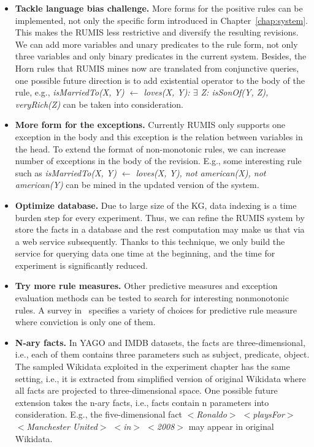\begin{itemize}
\item \textbf{Tackle language bias challenge.} More forms for the positive rules can be implemented, not only the specific form introduced in Chapter~\ref{chap:system}. This makes the RUMIS less restrictive and diversify the resulting revisions. We can add more variables and unary predicates to the rule form, not only three variables and only binary predicates in the current system. Besides, the Horn rules that RUMIS mines now are translated from conjunctive queries, one possible future direction is to add existential operator to the body of the rule, e.g., \textit{isMarriedTo(X, Y) $\leftarrow$ loves(X, Y): $\exists$ Z: isSonOf(Y, Z), veryRich(Z)} can be taken into consideration.
\item \textbf{More form for the exceptions.} Currently RUMIS only supports one exception in the body and this exception is the relation between variables in the head. To extend the format of non-monotonic rules, we can increase number of exceptions in the body of the revision. E.g., some interesting rule such as \textit{isMarriedTo(X, Y) $\leftarrow$ loves(X, Y), not american(X), not american(Y)} can be mined in the updated version of the system.
\item \textbf{Optimize database.} Due to large size of the KG, data indexing is a time burden step for every experiment. Thus, we can refine the RUMIS system by store the facts in a database and the rest computation may make us that via a web service subsequently. Thanks to this technique, we only build the service for querying data one time at the beginning, and the time for experiment is significantly reduced.
\item \textbf{Try more rule measures.} Other predictive measures and exception evaluation methods can be tested to search for interesting nonmonotonic rules. A survey in~\cite{ref46} specifies a variety of choices for predictive rule measure where conviction is only one of them.
\item \textbf{N-ary facts.} In YAGO and IMDB datasets, the facts are three-dimensional, i.e., each of them contains three parameters such as subject, predicate, object. The sampled Wikidata exploited in the experiment chapter has the same setting, i.e., it is extracted from simplified version of original Wikidata where all facts are projected to three-dimensional space. One possible future extension takes the n-ary facts, i.e., facts contain n parameters into consideration. E.g., the five-dimensional fact \textit{$<$Ronaldo$>$ $<$playsFor$>$ $<$Manchester United$>$ $<$in$>$ $<$2008$>$} may appear in original Wikidata.

\end{itemize}

